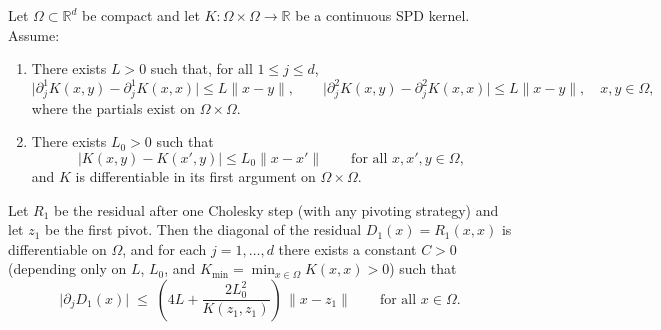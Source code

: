\documentclass[10pt,a4paper]{amsart}
\begin{document}
\begin{lemma}\label{lem:lipschitzchangemulti}
Let $\Omega\subset\mathbb{R}^d$ be compact and let $K:\Omega\times\Omega\to\mathbb{R}$ be a continuous SPD kernel.
Assume:
\begin{enumerate}[label=(\alph*)]
\item There exists $L>0$ such that, for all $1\le j\le d$,
\begin{equation}\label{eq:diag-deriv-lip}
\bigl|\partial_j^{1}K(x,y)-\partial_j^{1}K(x,x)\bigr|\le L\|x-y\|,
\qquad
\bigl|\partial_j^{2}K(x,y)-\partial_j^{2}K(x,x)\bigr|\le L\|x-y\|,
\quad x,y\in\Omega,
\end{equation}
where the partials exist on $\Omega\times\Omega$.
\item There exists $L_0>0$ such that
\begin{equation}\label{eq:first-arg-lip}
\bigl|K(x,y)-K(x',y)\bigr|\le L_0\|x-x'\|\qquad \text{for all }x,x',y\in\Omega,
\end{equation}
and $K$ is differentiable in its first argument on $\Omega\times\Omega$.
\end{enumerate}
Let $R_1$ be the residual after one Cholesky step (with any pivoting strategy) and let $z_1$ be the first pivot. Then the diagonal of the residual $D_1(x)=R_1(x,x)$ is differentiable on $\Omega$, and for each $j=1,\dots,d$ there exists a constant $C>0$ (depending only on $L$, $L_0$, and $K_{\min}=\min_{x\in\Omega}K(x,x)>0$) such that
\begin{equation}\label{eq:grad-D1-linear}
\bigl|\partial_j D_1(x)\bigr|\;\le\; \left(4L + \frac{2L_0^2}{K(z_1,z_1)}\right)\,\|x-z_1\|\qquad \text{for all }x\in\Omega.
\end{equation}
\end{lemma}
\end{document}
